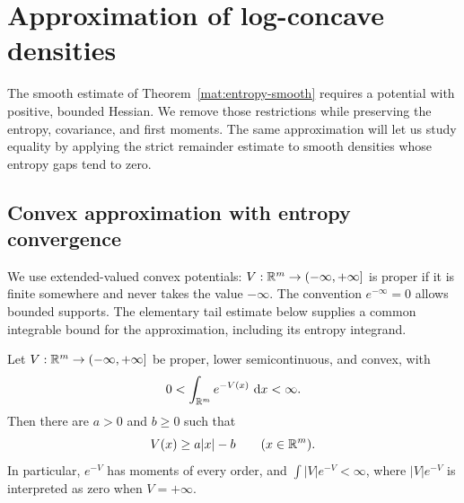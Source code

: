 \section{Approximation of log-concave densities}\label{geo:section}

The smooth estimate of Theorem~\ref{mat:entropy-smooth} requires a
potential with positive, bounded Hessian. We remove those restrictions
while preserving the entropy, covariance, and first moments. The same
approximation will let us study equality by applying the strict
remainder estimate to smooth densities whose entropy gaps tend to zero.

\subsection{Convex approximation with entropy convergence}

We use extended-valued convex potentials: $V:\mathbb R^m\to(-\infty,+\infty]$ is
proper if it is finite somewhere and never takes the value $-\infty$.
The convention $e^{-\infty}=0$ allows bounded supports.
The elementary tail estimate below supplies a common integrable bound for
the approximation, including its entropy integrand.

\begin{lemma}\label{geo:coercivity}
Let $V:\mathbb R^m\to(-\infty,+\infty]$ be proper, lower semicontinuous, and convex,
with
\[
  0<\int_{\mathbb R^m}e^{-V(x)}\,\,\mathrm d x<\infty.
\]
Then there are $a>0$ and $b\geq0$ such that
\begin{equation}\label{geo:linear-coercivity}
  V(x)\geq a|x|-b\qquad(x\in\mathbb R^m).
\end{equation}
In particular, $e^{-V}$ has moments of every order, and
$\int |V|e^{-V}<\infty$, where $|V|e^{-V}$ is interpreted as zero when
$V=+\infty$.
\end{lemma}

